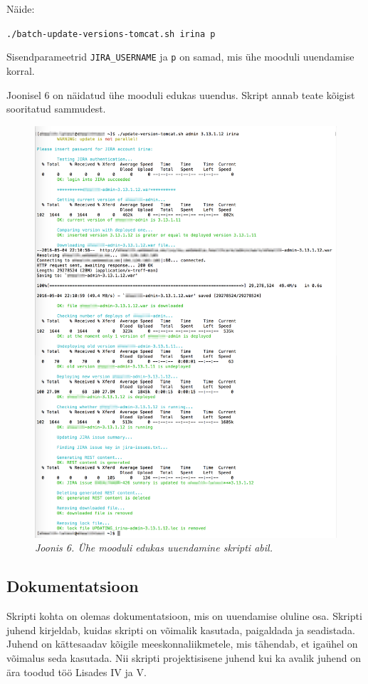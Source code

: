 \documentclass[12pt]{article}
\newcommand{\code}[1]{\texttt{#1}}
\begin{document}
  Näide:
  \begin{center}
    \small{\code{./batch-update-versions-tomcat.sh irina p}}
  \end{center}
  
    Sisendparameetrid \code{JIRA\_USERNAME} ja \code{p} on samad, mis ühe mooduli uuendamise korral.
  
  Joonisel 6 on näidatud ühe mooduli edukas uuendus. Skript annab teate kõigist sooritatud sammudest.
  
  \begin{figure}[H]
     \begin{center} 
       \includegraphics[width=.85\textwidth]{screenshots/one-module-successful-update.png}
       \caption*{\textit{Joonis 6. Ühe mooduli edukas uuendamine skripti abil.}}
     \end{center}
  \end{figure}
  
  \subsection{Dokumentatsioon}
  
  Skripti kohta on olemas dokumentatsioon, mis on uuendamise oluline osa. Skripti juhend kirjeldab, kuidas skripti on võimalik kasutada, paigaldada ja seadistada. Juhend on kättesaadav kõigile meeskonnaliikmetele, mis tähendab, et igaühel on võimalus seda kasutada. Nii skripti projektisisene juhend kui ka avalik juhend on ära toodud töö Lisades IV ja V.
  
\end{document}
